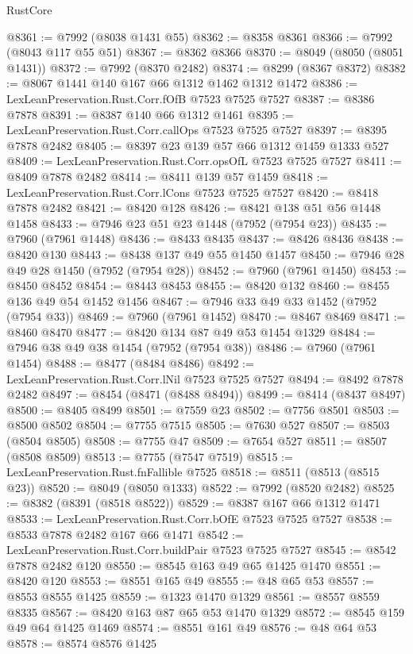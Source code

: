 \begin{lexlean}{RustCore}
\begin{coremodule}
@8361 := @7992 (@8038 @1431 @55)
@8362 := @8358 @8361
@8366 := @7992 (@8043 @117 @55 @51)
@8367 := @8362 @8366
@8370 := @8049 (@8050 (@8051 @1431))
@8372 := @7992 (@8370 @2482)
@8374 := @8299 (@8367 @8372)
@8382 := @8067 @1441 @140 @167 @66 @1312 @1462 @1312 @1472
@8386 := LexLeanPreservation.Rust.Corr.fOfB @7523 @7525 @7527
@8387 := @8386 @7878
@8391 := @8387 @140 @66 @1312 @1461
@8395 := LexLeanPreservation.Rust.Corr.callOps @7523 @7525 @7527
@8397 := @8395 @7878 @2482
@8405 := @8397 @23 @139 @57 @66 @1312 @1459 @1333 @527
@8409 := LexLeanPreservation.Rust.Corr.opsOfL @7523 @7525 @7527
@8411 := @8409 @7878 @2482
@8414 := @8411 @139 @57 @1459
@8418 := LexLeanPreservation.Rust.Corr.lCons @7523 @7525 @7527
@8420 := @8418 @7878 @2482
@8421 := @8420 @128
@8426 := @8421 @138 @51 @56 @1448 @1458
@8433 := @7946 @23 @51 @23 @1448 (@7952 (@7954 @23))
@8435 := @7960 (@7961 @1448)
@8436 := @8433 @8435
@8437 := @8426 @8436
@8438 := @8420 @130
@8443 := @8438 @137 @49 @55 @1450 @1457
@8450 := @7946 @28 @49 @28 @1450 (@7952 (@7954 @28))
@8452 := @7960 (@7961 @1450)
@8453 := @8450 @8452
@8454 := @8443 @8453
@8455 := @8420 @132
@8460 := @8455 @136 @49 @54 @1452 @1456
@8467 := @7946 @33 @49 @33 @1452 (@7952 (@7954 @33))
@8469 := @7960 (@7961 @1452)
@8470 := @8467 @8469
@8471 := @8460 @8470
@8477 := @8420 @134 @87 @49 @53 @1454 @1329
@8484 := @7946 @38 @49 @38 @1454 (@7952 (@7954 @38))
@8486 := @7960 (@7961 @1454)
@8488 := @8477 (@8484 @8486)
@8492 := LexLeanPreservation.Rust.Corr.lNil @7523 @7525 @7527
@8494 := @8492 @7878 @2482
@8497 := @8454 (@8471 (@8488 @8494))
@8499 := @8414 (@8437 @8497)
@8500 := @8405 @8499
@8501 := @7559 @23
@8502 := @7756 @8501
@8503 := @8500 @8502
@8504 := @7755 @7515
@8505 := @7630 @527
@8507 := @8503 (@8504 @8505)
@8508 := @7755 @47
@8509 := @7654 @527
@8511 := @8507 (@8508 @8509)
@8513 := @7755 (@7547 @7519)
@8515 := LexLeanPreservation.Rust.fnFallible @7525
@8518 := @8511 (@8513 (@8515 @23))
@8520 := @8049 (@8050 @1333)
@8522 := @7992 (@8520 @2482)
@8525 := @8382 (@8391 (@8518 @8522))
@8529 := @8387 @167 @66 @1312 @1471
@8533 := LexLeanPreservation.Rust.Corr.bOfE @7523 @7525 @7527
@8538 := @8533 @7878 @2482 @167 @66 @1471
@8542 := LexLeanPreservation.Rust.Corr.buildPair @7523 @7525 @7527
@8545 := @8542 @7878 @2482 @120
@8550 := @8545 @163 @49 @65 @1425 @1470
@8551 := @8420 @120
@8553 := @8551 @165 @49
@8555 := @48 @65 @53
@8557 := @8553 @8555 @1425
@8559 := @1323 @1470 @1329
@8561 := @8557 @8559 @8335
@8567 := @8420 @163 @87 @65 @53 @1470 @1329
@8572 := @8545 @159 @49 @64 @1425 @1469
@8574 := @8551 @161 @49
@8576 := @48 @64 @53
@8578 := @8574 @8576 @1425

\end{coremodule}
\end{lexlean}
